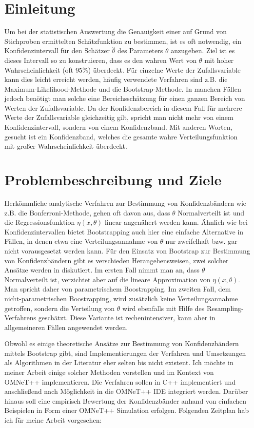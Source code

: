 \section{Einleitung}
Um bei der statistischen Auswertung die Genauigkeit einer auf Grund von Stichproben ermittelten Schätzfunktion zu bestimmen, ist es oft notwendig, ein Konfidenzintervall für den Schätzer $\hat{\theta}$ des Parameters $\theta$ anzugeben. 
Ziel ist es dieses Intervall so zu konstruieren, dass es den wahren Wert von $\theta$  mit hoher Wahrscheinlichkeit (oft 95\%) überdeckt. 
Für einzelne Werte der Zufallsvariable kann dies leicht erreicht werden, häufig verwendete Verfahren sind z.B. die Maximum-Likelihood-Methode und die Bootstrap-Methode. 
In manchen Fällen jedoch benötigt man solche eine Bereichsschätzung für einen ganzen Bereich von Werten der Zufallsvariable. 
Da der Konfidenzbereich in diesem Fall für mehrere Werte der Zufallsvariable gleichzeitig gilt, spricht man nicht mehr von einem Konfidenzintervall, sondern von einem Konfidenzband. 
Mit anderen Worten, gesucht ist ein Konfidenzband, welches die gesamte wahre Verteilungsfunktion mit großer Wahrscheinlichkeit überdeckt.

\section{Problembeschreibung und Ziele}
Herkömmliche analytische Verfahren zur Bestimmung von Konfidenzbändern wie z.B. die Bonferroni-Methode, gehen oft davon aus, dass $\theta$ Normalverteilt ist und die Regressionsfunktion $\eta(x,\theta)$ linear angenähert werden kann.
Ähnlich wie bei Konfidenzintervallen bietet Bootstrapping auch hier eine einfache Alternative in Fällen, in denen etwa eine Verteilungsannahme von $\theta$ nur zweifelhaft bzw. gar nicht vorausgesetzt werden kann. 
Für den Einsatz von Bootstrap zur Bestimmung von Konfidenzbändern gibt es verschieden Herangehensweisen, zwei solcher Ansätze werden in \cite{1,2} diskutiert. 
Im ersten Fall nimmt man an, dass $\theta$ Normalverteilt ist, verzichtet aber auf die lineare Approximation von $\eta(x,\theta)$. 
Man spricht daher von parametrischem Boostrapping.
Im zweiten Fall, dem nicht-parametrischen Boostrapping, wird zusätzlich keine Verteilungsannahme getroffen, sondern die Verteilung von $\theta$ wird ebenfalls mit Hilfe des Resampling-Verfahrens geschätzt. 
Diese Variante ist rechenintensiver, kann aber in allgemeineren Fällen angewendet werden.

Obwohl es einige theoretische Ansätze zur Bestimmung von Konfidenzbändern mittels Bootstrap gibt, sind Implementierungen der Verfahren und Umsetzungen als Algorithmen in der Literatur eher selten bis nicht existent.
Ich möchte in meiner Arbeit einige solcher Methoden vorstellen und im Kontext von OMNeT++ implementieren.
Die Verfahren sollen in C++ implementiert und anschließend nach Möglichkeit in die OMNeT++ IDE integriert werden.
Darüber hinaus soll eine empirisch Bewertung der Konfidenzbänder anhand von einfachen Beispielen in Form einer OMNeT++ Simulation erfolgen.
Folgenden Zeitplan hab ich für meine Arbeit vorgesehen:



